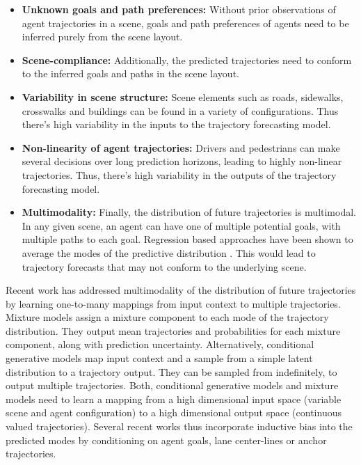 \documentclass[journal]{IEEEtran}
\begin{document}
 
\begin{itemize}
    \item \textbf{Unknown goals and path preferences:} Without prior observations of agent trajectories in a scene, goals and path preferences of agents need to be inferred purely from the scene layout.
    \item \textbf{Scene-compliance:} Additionally, the predicted trajectories need to conform to the inferred goals and paths in the scene layout.
    \item \textbf{Variability in scene structure:} Scene elements such as roads, sidewalks, crosswalks and buildings can be found in a variety of configurations. Thus there's high variability in the inputs to the trajectory forecasting model.
    \item \textbf{Non-linearity of agent trajectories:} Drivers and pedestrians can make several decisions over long prediction horizons, leading to highly non-linear trajectories. Thus, there's high variability in the outputs of the trajectory forecasting model. 
    \item \textbf{Multimodality:} Finally, the distribution of future trajectories is multimodal. In any given scene, an agent can have one of multiple potential goals, with multiple paths to each goal. Regression based approaches have been shown to average the modes of the predictive distribution \cite{lee2017desire, gupta2018social, deo2018convolutional}. This would lead to trajectory forecasts that may not conform to the underlying scene. 
\end{itemize}





Recent work has addressed multimodality of the distribution of future trajectories by learning one-to-many mappings from input context to multiple trajectories. Mixture models \cite{deo2018multi, cui2019multimodal, deo2018convolutional, zyner2019naturalistic, casas2018intentnet, ridel2019scene, messaoud2020multi,hong2019rules} assign a mixture component to each mode of the trajectory distribution. They output mean trajectories and probabilities for each mixture component, along with prediction uncertainty. Alternatively, conditional generative models \cite{gupta2018social, sadeghian2018sophie, zhao2019multi, lee2017desire, rhinehart2018r2p2, bhattacharyya2019conditional, bhattacharyya2018accurate, rhinehart2019precog} map input context and a sample from a simple latent distribution to a trajectory output. They can be sampled from indefinitely, to output multiple trajectories. Both, conditional generative models and mixture models need to learn a mapping from a high dimensional input space (variable scene and agent configuration) to a high dimensional output space (continuous valued trajectories). Several recent works thus incorporate inductive bias into the predicted modes by conditioning on agent goals\cite{zhao2020tnt, mangalam2020not, mangalam2020goals}, lane center-lines\cite{zhang2020map, chang2019argoverse, luo2020probabilistic} or anchor trajectories\cite{chai2020multipath, phan2020covernet}.  
\end{document}
